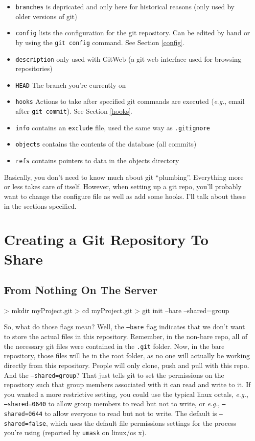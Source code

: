 \documentclass[10pt,letterpaper]{article}
\begin{document}
\begin{itemize}
  \item \texttt{branches} is depricated and only here for historical reasons (only used by older versions of git)
  \item \texttt{config} lists the configuration for the git repository. Can be edited by hand or by using the \texttt{git config} command. See Section \ref{config}.
  \item \texttt{description} only used with GitWeb (a git web interface used for browsing repositories)
  \item \texttt{HEAD} The branch you're currently on
  \item \texttt{hooks} Actions to take after specified git commands are executed (\textit{e.g.}, email after \texttt{git commit}). See Section \ref{hooks}.
  \item \texttt{info} contains an \texttt{exclude} file, used the same way as \texttt{.gitignore}
  \item \texttt{objects} contains the contents of the database (all commits)
  \item \texttt{refs} contains pointers to data in the objects directory
\end{itemize}
Basically, you don't need to know much about git ``plumbing''. Everything more or less takes care of itself. However, when setting up a git repo, you'll probably want to change the configure file as well as add some hooks. I'll talk about these in the sections specified.

\section{Creating a Git Repository To Share}

\subsection{From Nothing On The Server}

\begin{code}
> mkdir myProject.git
> cd myProject.git
> git init --bare --shared=group
\end{code}
\noindent So, what do those flags mean? Well, the \texttt{--bare} flag indicates that we don't want to store the actual files in this repository. Remember, in the non-bare repo, all of the necessary git files were contained in the \texttt{.git} folder. Now, in the bare repository, those files will be in the root folder, as no one will actually be working directly from this repository. People will only clone, push and pull with this repo. And the \texttt{--shared=group}? That just tells git to set the permissions on the repository such that group members associated with it can read and write to it. If you wanted a more restrictive setting, you could use the typical linux octals, \textit{e.g.}, \texttt{--shared=0640} to allow group members to read but not to write, or \textit{e.g.}, \texttt{--shared=0644} to allow everyone to read but not to write. The default is \texttt{--shared=false}, which uses the default file permissions settings for the process you're using (reported by \texttt{umask} on linux/os x).
\end{document}
